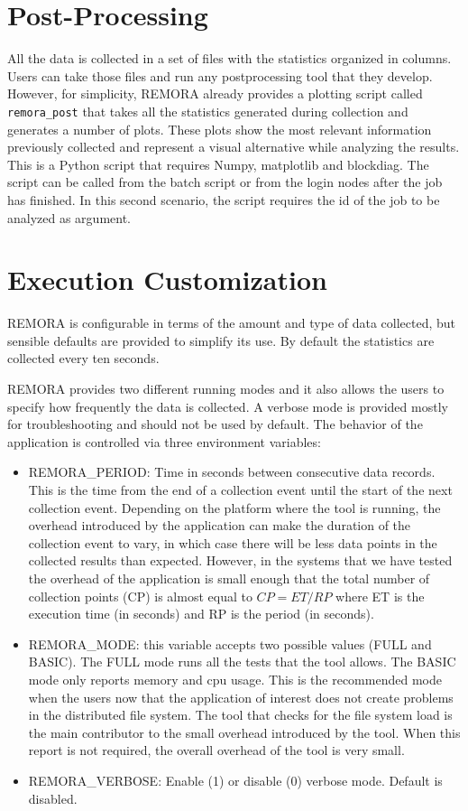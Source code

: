 \documentclass[10pt,a4paper]{report}
\begin{document}
\section{Post-Processing}
All the data is collected in a set of files with the statistics organized in columns. Users can take those files and run any postprocessing tool that they develop. However, for simplicity, REMORA already provides a plotting script called \verb+remora_post+ that takes all the statistics generated during collection and generates a number of plots. These plots show the most relevant information previously collected and represent a visual alternative while analyzing the results. This is a Python script that requires Numpy, matplotlib and blockdiag. The script can be called from the batch script or from the login nodes after the job has finished. In this second scenario, the script requires the id of the job to be analyzed as argument.

\section{Execution Customization}

REMORA is configurable in terms of the amount and type of data collected, but sensible defaults are provided to simplify its use. By default the statistics are collected every ten seconds.

REMORA provides two different running modes and it also allows the users to specify how frequently the data is collected. A verbose mode is provided mostly for troubleshooting and should not be used by default. The behavior of the application is controlled via three environment variables:

\begin{itemize}
	\item REMORA\_PERIOD: Time in seconds between consecutive data records. This is the time from the end of a collection event until the start of the next collection event. Depending on the platform where the tool is running, the overhead introduced by the application can make the duration of the collection event to vary, in which case there will be less data points in the collected results than expected. However, in the systems that we have tested the overhead of the application is small enough that the total number of collection points (CP) is almost equal to $CP = ET/RP$ where ET is the execution time (in seconds) and RP is the period (in seconds).

	\item REMORA\_MODE: this variable accepts two possible values (FULL and BASIC). The FULL mode runs all the tests that the tool allows. The BASIC mode only reports memory and cpu usage. This is the recommended mode when the users now that the application of interest does not create problems in the distributed file system. The tool that checks for the file system load \cite{xltop} is the main contributor to the small overhead introduced by the tool. When this report is not required, the overall overhead of the tool is very small.
	
	\item REMORA\_VERBOSE: Enable (1) or disable (0) verbose mode. Default is disabled.
\end{itemize}
\end{document}
